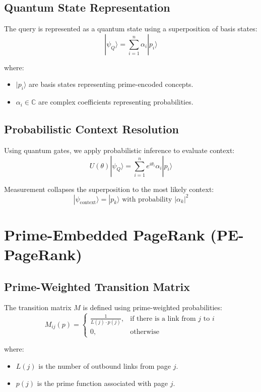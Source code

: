 \documentclass{article}
\theoremstyle{plain}
\theoremstyle{claimstyle}
\begin{document}
\subsection{Quantum State Representation}
The query is represented as a quantum state using a superposition of basis states:
\[
|\psi_Q\rangle = \sum_{i=1}^{n} \alpha_i |p_i\rangle
\]

where:
\begin{itemize}
    \item \( |p_i\rangle \) are basis states representing prime-encoded concepts.
    \item \( \alpha_i \in \mathbb{C} \) are complex coefficients representing probabilities.
\end{itemize}

\subsection{Probabilistic Context Resolution}
Using quantum gates, we apply probabilistic inference to evaluate context:
\[
U(\theta) |\psi_Q\rangle = \sum_{i=1}^{n} e^{i \theta_i} \alpha_i |p_i\rangle
\]

Measurement collapses the superposition to the most likely context:
\[
|\psi_{\text{context}}\rangle = |p_k\rangle \text{ with probability } |\alpha_k|^2
\]

\section{Prime-Embedded PageRank (PE-PageRank)}

\subsection{Prime-Weighted Transition Matrix}
The transition matrix \(M\) is defined using prime-weighted probabilities:
\[
M_{ij}(p) = \begin{cases}
\frac{1}{L(j) \cdot p(j)}, & \text{if there is a link from } j \text{ to } i \\
0, & \text{otherwise}
\end{cases}
\]

where:
\begin{itemize}
    \item \( L(j) \) is the number of outbound links from page \(j\).
    \item \( p(j) \) is the prime function associated with page \(j\).
\end{itemize}
\end{document}
